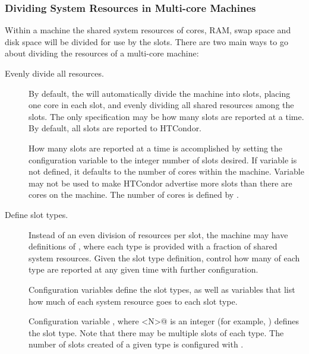 \subsubsection{\label{sec:SMP-Divide}
Dividing System Resources in Multi-core Machines}

Within a machine the shared system resources of
cores, RAM, swap space and disk space will be divided for
use by the slots. 
There are two main ways to go about dividing the resources of 
a multi-core machine:

\begin{description}

\item[Evenly divide all resources.]  
  By default, the  will
  automatically	divide the machine into slots,
  placing one core in each slot, and evenly dividing
  all shared resources among the slots.
  The only specification may be how many slots are reported at a time.
  By default, all slots are reported to HTCondor.

  How many slots are reported at a time
  is accomplished by setting the configuration
  variable  to the integer number of slots desired.
  If variable  is not defined,
  it defaults to the number of cores within the machine.
  Variable  may not be used to make HTCondor advertise more
  slots than there are cores on the machine.
  The number of cores is defined by .

\item[Define slot types.]
  Instead of an even division of resources per slot,
  the machine may have definitions of ,
  where each type is provided with a fraction of shared system resources.
  Given the slot type definition, control how many of each
  type are reported at any given time with further configuration.

  Configuration variables define the slot types,
  as well as variables that list how much of each system resource goes
  to each slot type.  

  Configuration variable ,
  where \verb@<N>@ is an integer 
  (for example, )
  defines the slot type.
  Note that there may be multiple slots of each type.  
  The number of slots created of a given type
  is configured with .


\end{description}
